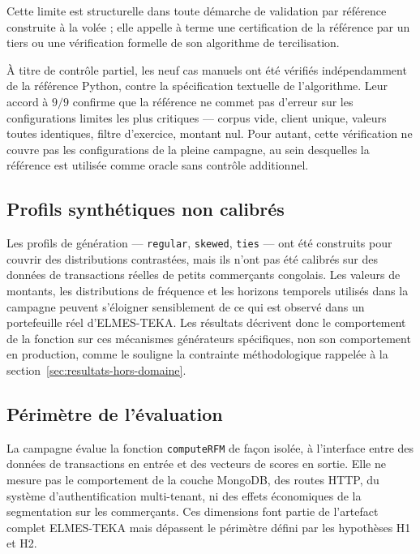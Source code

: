 Cette limite est structurelle dans toute démarche de validation par référence construite à
la volée ; elle appelle à terme une certification de la référence par un tiers ou une
vérification formelle de son algorithme de tercilisation.

À titre de contrôle partiel, les neuf cas manuels ont été vérifiés indépendamment de la
référence Python, contre la spécification textuelle de l'algorithme. Leur accord à $9/9$
confirme que la référence ne commet pas d'erreur sur les configurations limites les plus
critiques — corpus vide, client unique, valeurs toutes identiques, filtre d'exercice, montant
nul. Pour autant, cette vérification ne couvre pas les configurations de la pleine campagne,
au sein desquelles la référence est utilisée comme oracle sans contrôle additionnel.

\subsection{Profils synthétiques non calibrés}
\label{subsec:disc-vi-synth}

Les profils de génération — \texttt{regular}, \texttt{skewed}, \texttt{ties} — ont été
construits pour couvrir des distributions contrastées, mais ils n'ont pas été calibrés sur
des données de transactions réelles de petits commerçants congolais. Les valeurs de montants,
les distributions de fréquence et les horizons temporels utilisés dans la campagne peuvent
s'éloigner sensiblement de ce qui est observé dans un portefeuille réel d'ELMES-TEKA. Les
résultats décrivent donc le comportement de la fonction sur ces mécanismes générateurs
spécifiques, non son comportement en production, comme le souligne la contrainte méthodologique
rappelée à la section~\ref{sec:resultats-hors-domaine}.

\subsection{Périmètre de l'évaluation}
\label{subsec:disc-vi-perimetre}

La campagne évalue la fonction \texttt{computeRFM} de façon isolée, à l'interface entre des
données de transactions en entrée et des vecteurs de scores en sortie. Elle ne mesure pas le
comportement de la couche MongoDB, des routes HTTP, du système d'authentification multi-tenant,
ni des effets économiques de la segmentation sur les commerçants. Ces dimensions font partie
de l'artefact complet ELMES-TEKA \citep{James2023} mais dépassent le périmètre défini par
les hypothèses H1 et H2.

